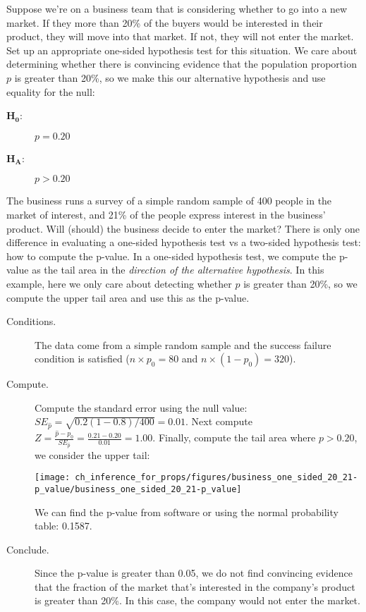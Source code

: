 \begin{example}{Suppose we're on a business team that is
    considering whether to go into a new market. If they
    more than 20\% of the buyers would be interested in
    their product, they will move into that market. If not,
    they will not enter the market. Set up an appropriate
    one-sided hypothesis test for this situation.}
  We care about determining whether there is convincing
  evidence that the population proportion $p$ is greater
  than 20\%, so we make this our alternative hypothesis
  and use equality for the null:
  \begin{description}
  \item[$\mathbf{H_0}$:] $p = 0.20$
  \item[$\mathbf{H_A}$:] $p > 0.20$
  \end{description}
\end{example}

\begin{example}{The business runs a survey of a simple
    random sample of 400 people in the market of interest,
    and 21\% of the people express interest in the
    business' product. Will (should) the business decide
    to enter the market?}
    \label{business_one_sided_20_21}
  There is only one difference in evaluating a one-sided
  hypothesis test vs a two-sided hypothesis test: how to
  compute the p-value.
  In a one-sided hypothesis test, we compute the p-value as
  the tail area in the \emph{direction of the alternative
  hypothesis}. In this example, here we only care about
  detecting whether $p$ is greater than 20\%, so we compute
  the upper tail area and use this as the p-value.
  \begin{description}
  \item[Conditions.] The data come from a simple random sample
      and the success failure condition is satisfied
      ($n \times p_0 = 80$ and $n \times (1 - p_0) = 320$).
  \item[Compute.] Compute the standard error using the null
      value: $SE_{\hat{p}} = \sqrt{0.2 (1 - 0.8) / 400} = 0.01$.
      Next compute
      $Z = \frac{\hat{p} - p_0}{SE_{\hat{p}}}
         = \frac{0.21 - 0.20}{0.01}
         = 1.00$.
      Finally, compute the tail area where $p > 0.20$,
      we consider the upper tail:
      \begin{center}
      \texttt{[image: ch\_inference\_for\_props/figures/business\_one\_sided\_20\_21-p\_value/business\_one\_sided\_20\_21-p\_value]}
      \end{center}
      We can find the p-value from software or using the
      normal probability table: 0.1587.
  \item[Conclude.] Since the p-value is greater than 0.05,
      we do not find convincing evidence that the fraction
      of the market that's interested in the company's
      product is greater than 20\%. In this case, the
      company would not enter the market.
  \end{description}
\end{example}

